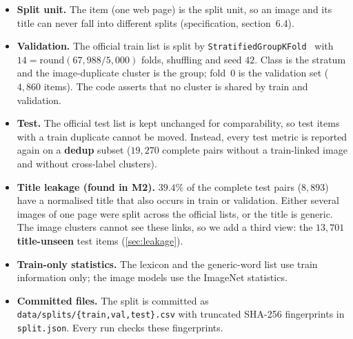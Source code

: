 \begin{itemize}
  \item \textbf{Split unit.} The item (one web page) is the split unit, so an image and its title can never fall into
        different splits (specification, section~6.4).
  \item \textbf{Validation.} The official train list is split by
        \texttt{StratifiedGroupKFold}~\cite{pedregosa2011sklearn} with $14 = \mathrm{round}(67{,}988/5{,}000)$ folds,
        shuffling and seed $42$. Class is the stratum and the image-duplicate cluster is the group; fold~0 is the
        validation set ($4{,}860$ items). The code asserts that no cluster is shared by train and validation.
  \item \textbf{Test.} The official test list is kept unchanged for comparability, so test items with a train
        duplicate cannot be moved. Instead, every test metric is reported again on a \textbf{dedup} subset
        ($19{,}270$ complete pairs without a train-linked image and without cross-label clusters).
  \item \textbf{Title leakage (found in M2).} $39.4\%$ of the complete test pairs ($8{,}893$) have a normalised
        title that also occurs in train or validation. Either several images of one page were split across the
        official lists, or the title is generic. The image clusters cannot see these links, so we add a third
        view: the $13{,}701$ \textbf{title-unseen} test items (\cref{sec:leakage}).
  \item \textbf{Train-only statistics.} The lexicon and the generic-word list use train information only; the image
        models use the ImageNet statistics.
  \item \textbf{Committed files.} The split is committed as \texttt{data/splits/\{train,val,test\}.csv} with
        truncated SHA-256 fingerprints in \texttt{split.json}. Every run checks these fingerprints.
\end{itemize}

